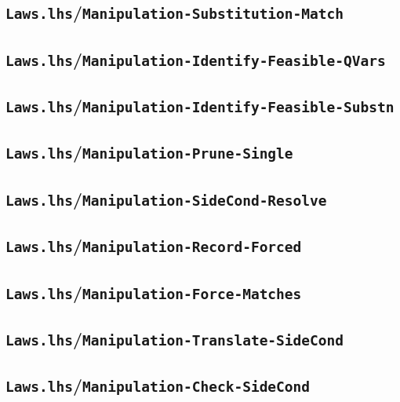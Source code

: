 \subsection{\texttt{Laws.lhs}/\texttt{Manipulation-Substitution-Match}}


\newpage
\subsection{\texttt{Laws.lhs}/\texttt{Manipulation-Identify-Feasible-QVars}}


\subsection{\texttt{Laws.lhs}/\texttt{Manipulation-Identify-Feasible-Substn}}


\subsection{\texttt{Laws.lhs}/\texttt{Manipulation-Prune-Single}}


\newpage
\subsection{\texttt{Laws.lhs}/\texttt{Manipulation-SideCond-Resolve}}


\subsection{\texttt{Laws.lhs}/\texttt{Manipulation-Record-Forced}}


\newpage
\subsection{\texttt{Laws.lhs}/\texttt{Manipulation-Force-Matches}}


\subsection{\texttt{Laws.lhs}/\texttt{Manipulation-Translate-SideCond}}


\subsection{\texttt{Laws.lhs}/\texttt{Manipulation-Check-SideCond}}


